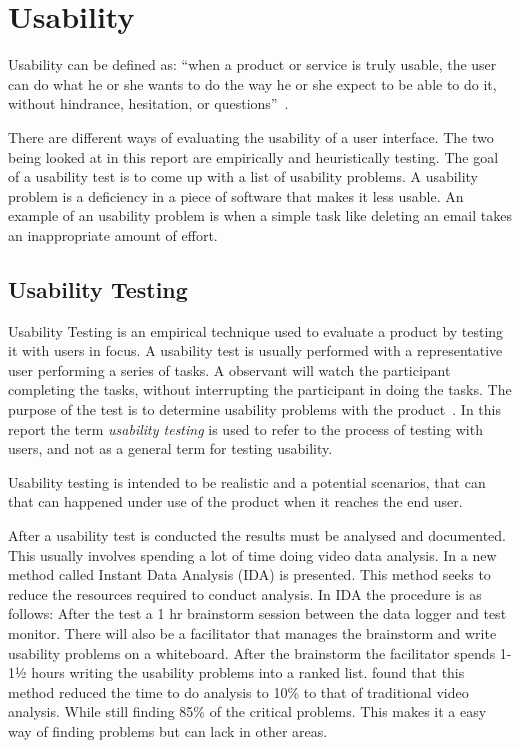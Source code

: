 \section{Usability}
\label{sub:usability}

Usability can be defined as: \enquote{when a product or service is truly usable, the user can do what he or she wants to do the way he or she expect to be able to do it, without hindrance, hesitation, or questions}~\cite{RubinChisnellSpool08}.

There are different ways of evaluating the usability of a user interface. The two being looked at in this report are empirically and heuristically testing. The goal of a usability test is to come up with a list of usability problems. A usability problem is a deficiency in a piece of software that makes it less usable. An example of an usability problem is when a simple task like deleting an email takes an inappropriate amount of effort.

\subsection{Usability Testing}
Usability Testing is an empirical technique used to evaluate a product by testing it with users in focus. A usability test is usually performed with a representative user performing a series of tasks. A observant will watch the participant completing the tasks, without interrupting the participant in doing the tasks. The purpose of the test is to determine usability problems with the product~\cite{RubinChisnellSpool08}. In this report the term \emph{usability testing} is used to refer to the process of testing with users, and not as a general term for testing usability. 

Usability testing is intended to be realistic and a potential scenarios, that can that can happened under use of the product when it reaches the end user.

After a usability test is conducted the results must be analysed and documented. This usually involves spending a lot of time doing video data analysis. In \cite{kjeldskov2004instant} a new method called Instant Data Analysis (IDA) is presented. This method seeks to reduce the resources required to conduct analysis. In IDA the procedure is as follows: After the test a 1 hr brainstorm session between the data logger and test monitor. There will also be a facilitator that manages the brainstorm and write usability problems on a whiteboard. After the brainstorm the facilitator spends 1-1½ hours writing the usability problems into a ranked list. \cite{kjeldskov2004instant} found that this method reduced the time to do analysis to 10\% to that of traditional video analysis. While still finding 85\% of the critical problems. This makes it a easy way of finding problems but can lack in other areas.

